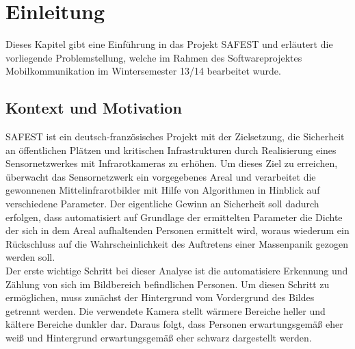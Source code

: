 \section{Einleitung}
\label{chap:einleitung}

Dieses Kapitel gibt eine Einführung in das Projekt SAFEST und erläutert die vorliegende Problemstellung, welche im Rahmen des Softwareprojektes Mobilkommunikation im Wintersemester 13/14 bearbeitet wurde.


\subsection{Kontext und Motivation}
\label{sec:motivation}

SAFEST ist ein deutsch-französisches Projekt mit der Zielsetzung, die Sicherheit an öffentlichen Plätzen und kritischen Infrastrukturen durch Realisierung eines Sensornetzwerkes mit Infrarotkameras zu erhöhen.
 Um dieses Ziel zu erreichen, überwacht das Sensornetzwerk ein vorgegebenes Areal und verarbeitet die gewonnenen Mittelinfrarotbilder mit Hilfe von Algorithmen in Hinblick auf verschiedene Parameter.
 Der eigentliche Gewinn an Sicherheit soll dadurch erfolgen, dass automatisiert auf Grundlage der ermittelten Parameter die Dichte der sich in dem Areal aufhaltenden Personen ermittelt wird, woraus wiederum ein Rückschluss auf die Wahrscheinlichkeit des Auftretens einer Massenpanik gezogen werden soll.\\
Der erste wichtige Schritt bei dieser Analyse ist die automatisiere Erkennung und Zählung von sich im Bildbereich befindlichen Personen.
 Um diesen Schritt zu ermöglichen, muss zunächst der Hintergrund vom Vordergrund des Bildes getrennt werden.
Die verwendete Kamera stellt wärmere Bereiche heller und kältere Bereiche dunkler dar. Daraus folgt, dass Personen erwartungsgemäß eher weiß und Hintergrund erwartungsgemäß eher schwarz dargestellt werden.
